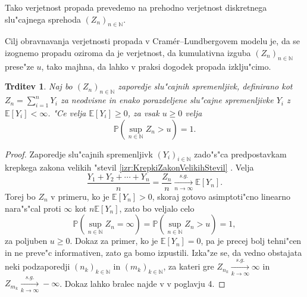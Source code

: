\documentclass[12pt, a4paper, reqno]{amsart}
\theoremstyle{definition}
\theoremstyle{plain}
\newtheorem{trditev}[definicija]{Trditev}
\newcommand{\N}{\mathbb{N}}
\newcommand{\E}{\mathbb{E}}
\newcommand{\Prob}{\mathbb{P}}
\newcommand{\1}{\mathds{1}}
\newcommand*{\refPriloga}[1]{%
  \begingroup
    \hypersetup{
      linkcolor=red,
      linkbordercolor=red,
    }%
    \ref{#1}%
  \endgroup
}
\begin{document}
        Tako verjetnost propada prevedemo na prehodno verjetnost diskretnega slu"cajnega 
        sprehoda $(Z_n)_{n\in\N}$.
        
        Cilj obravnavanja verjetnosti propada v 
        Cramér--Lundbergovem modelu je, da se izognemo propadu oziroma da je verjetnost, 
        da kumulativna izguba $(Z_n)_{n\in\N}$ prese"ze $u$,
        tako majhna, da lahko v praksi dogodek propada izklju"cimo. 

        \begin{trditev}
            Naj bo $(Z_n)_{n\in\N}$ zaporedje slu"cajnih spremenljivk, definirano kot 
            $Z_n = \sum_{i=1}^nY_i$ za neodvisne in enako porazdeljene slu"cajne spremenljivke 
            $Y_i$ z $\E\left[Y_i\right] < \infty$. 
            "Ce velja $\E\left[Y_i\right] \geq 0$, za vsak $u\geq0$ velja
            \begin{equation*}
                \Prob\left(\sup_{n\in\N}Z_n > u\right) = 1.
            \end{equation*}
            \label{trd:propadZVerjetnostjo1}
        \end{trditev}

        \begin{proof}
            Zaporedje slu"cajnih spremenljivk $(Y_i)_{i\in\N}$ zado"s"ca predpostavkam krepkega zakona
            velikih "stevil \refPriloga{izr:KrepkiZakonVelikihStevil}. Velja
            \begin{equation*}
                \frac{Y_1 + Y_2 + \cdots + Y_n}{n} = \frac{Z_n}{n} \xrightarrow[n\to\infty]{s.g.} \E\left[Y_n\right].
            \end{equation*}
            Torej bo $Z_n$ v primeru, ko je $\E\left[Y_n\right]>0$, 
             skoraj gotovo asimptoti"cno linearno nara"s"cal proti $\infty$ kot $n \E\left[Y_n\right]$, 
            zato bo veljalo celo
            \begin{equation*}
                \Prob\left(\sup_{n\in\N}Z_n = \infty\right) = \Prob\left(\sup_{n\in\N}Z_n > u\right) = 1,
            \end{equation*}
            za poljuben $u\geq 0$. Dokaz za primer, ko je $\E\left[Y_n\right] = 0$, pa
            je precej bolj tehni"cen in ne preve"c informativen, zato 
            ga bomo izpustili. Izka"ze se, da vedno obstajata neki podzaporedji $(n_k)_{k\in\N}$ in $(m_k)_{k\in\N}$, 
            za kateri gre
            $Z_{n_k} \xrightarrow[k\to\infty]{s.g.}\infty$ in 
            $Z_{m_k} \xrightarrow[k\to\infty]{s.g.}-\infty$.
            Dokaz lahko bralec najde v \cite{6} v poglavju 4.
        \end{proof}
\end{document}

